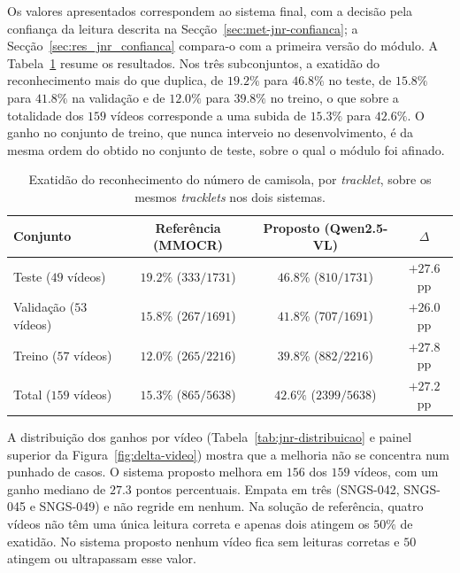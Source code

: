 Os valores apresentados correspondem ao sistema final, com a decisão pela confiança da leitura descrita
na Secção~\ref{sec:met-jnr-confianca}; a Secção~\ref{sec:res_jnr_confianca} compara-o com a primeira
versão do módulo. A Tabela~\ref{tab:jnr} resume os resultados. Nos três subconjuntos, a exatidão do reconhecimento mais
do que duplica, de $19.2\%$ para $46.8\%$ no teste, de $15.8\%$ para
$41.8\%$ na validação e de $12.0\%$ para $39.8\%$ no treino, o que sobre a
totalidade dos $159$ vídeos corresponde a uma subida de $15.3\%$ para $42.6\%$. O ganho no
conjunto de treino, que nunca interveio no desenvolvimento, é da mesma ordem do obtido no conjunto de
teste, sobre o qual o módulo foi afinado.

\begin{table}[htbp]
    \centering
    \caption{Exatidão do reconhecimento do número de camisola, por \emph{tracklet}, sobre os mesmos
    \emph{tracklets} nos dois sistemas.}
    \label{tab:jnr}
    \begin{tabular}{|l|c|c|c|}
        \hline
        \textbf{Conjunto} & \textbf{Referência (MMOCR)} & \textbf{Proposto (Qwen2.5-VL)} & \textbf{$\Delta$} \\
        \hline
        Teste ($49$ vídeos)     & $19.2\%$ ($333/1731$)   & $46.8\%$ ($810/1731$)   & $+27.6$ pp \\
        \hline
        Validação ($53$ vídeos) & $15.8\%$ ($267/1691$) & $41.8\%$ ($707/1691$) & $+26.0$ pp \\
        \hline
        Treino ($57$ vídeos)    & $12.0\%$ ($265/2216$) & $39.8\%$ ($882/2216$) & $+27.8$ pp \\
        \hline
        Total ($159$ vídeos)    & $15.3\%$ ($865/5638$)     & $42.6\%$ ($2399/5638$)     & $+27.2$ pp \\
        \hline
    \end{tabular}
\end{table}

A distribuição dos ganhos por vídeo (Tabela~\ref{tab:jnr-distribuicao} e painel superior da
Figura~\ref{fig:delta-video}) mostra que a melhoria não se concentra num punhado de casos. O
sistema proposto melhora em $156$ dos $159$ vídeos, com um ganho mediano de $27.3$ pontos
percentuais. Empata em três (SNGS-042, SNGS-045 e SNGS-049) e não regride em nenhum. Na solução de referência, quatro
vídeos não têm uma única leitura correta e apenas dois atingem os $50\%$ de exatidão. No sistema
proposto nenhum vídeo fica sem leituras corretas e $50$ atingem ou ultrapassam esse valor.

